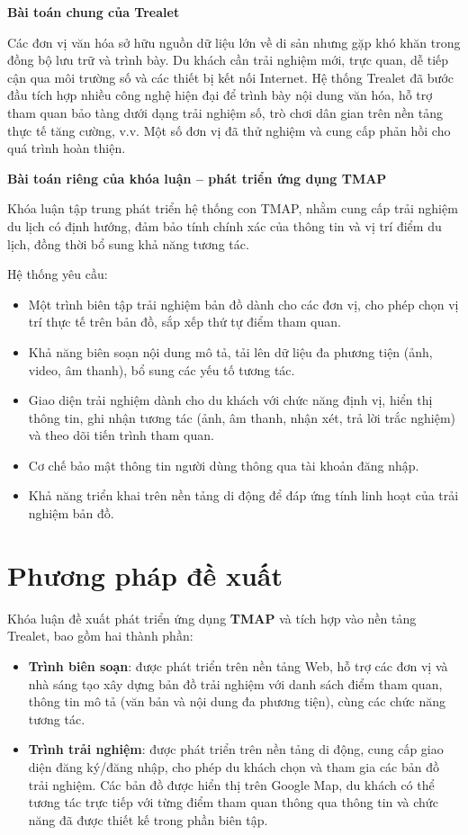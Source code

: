 \textbf{Bài toán chung của Trealet}  

Các đơn vị văn hóa sở hữu nguồn dữ liệu lớn về di sản nhưng gặp khó khăn trong đồng bộ lưu trữ và trình bày. Du khách cần trải nghiệm mới, trực quan, dễ tiếp cận qua môi trường số và các thiết bị kết nối Internet. Hệ thống Trealet đã bước đầu tích hợp nhiều công nghệ hiện đại để trình bày nội dung văn hóa, hỗ trợ tham quan bảo tàng dưới dạng trải nghiệm số, trò chơi dân gian trên nền tảng thực tế tăng cường, v.v. Một số đơn vị đã thử nghiệm và cung cấp phản hồi cho quá trình hoàn thiện.  

\textbf{Bài toán riêng của khóa luận – phát triển ứng dụng TMAP}  

Khóa luận tập trung phát triển hệ thống con TMAP, nhằm cung cấp trải nghiệm du lịch có định hướng, đảm bảo tính chính xác của thông tin và vị trí điểm du lịch, đồng thời bổ sung khả năng tương tác.  

Hệ thống yêu cầu:  
\begin{itemize}
    \item Một trình biên tập trải nghiệm bản đồ dành cho các đơn vị, cho phép chọn vị trí thực tế trên bản đồ, sắp xếp thứ tự điểm tham quan.  
    \item Khả năng biên soạn nội dung mô tả, tải lên dữ liệu đa phương tiện (ảnh, video, âm thanh), bổ sung các yếu tố tương tác.  
    \item Giao diện trải nghiệm dành cho du khách với chức năng định vị, hiển thị thông tin, ghi nhận tương tác (ảnh, âm thanh, nhận xét, trả lời trắc nghiệm) và theo dõi tiến trình tham quan.  
    \item Cơ chế bảo mật thông tin người dùng thông qua tài khoản đăng nhập.  
    \item Khả năng triển khai trên nền tảng di động để đáp ứng tính linh hoạt của trải nghiệm bản đồ.  
\end{itemize}

\section{Phương pháp đề xuất}

Khóa luận đề xuất phát triển ứng dụng \textbf{TMAP} và tích hợp vào nền tảng Trealet, bao gồm hai thành phần:  
\begin{itemize}
    \item \textbf{Trình biên soạn}: được phát triển trên nền tảng Web, hỗ trợ các đơn vị và nhà sáng tạo xây dựng bản đồ trải nghiệm với danh sách điểm tham quan, thông tin mô tả (văn bản và nội dung đa phương tiện), cùng các chức năng tương tác.  
    \item \textbf{Trình trải nghiệm}: được phát triển trên nền tảng di động, cung cấp giao diện đăng ký/đăng nhập, cho phép du khách chọn và tham gia các bản đồ trải nghiệm. Các bản đồ được hiển thị trên Google Map, du khách có thể tương tác trực tiếp với từng điểm tham quan thông qua thông tin và chức năng đã được thiết kế trong phần biên tập.  
\end{itemize}

